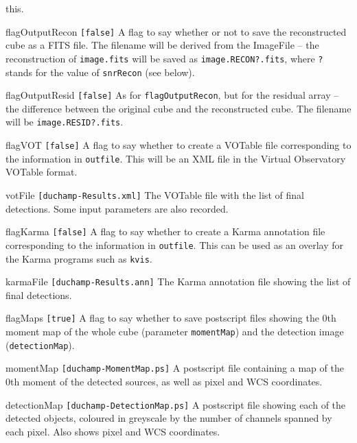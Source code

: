 \documentclass[12pt,a4paper]{article}
\newcommand{\entrylabel}[1]{\mbox{\textsf{\bf{#1:}}}\hfil}
\newenvironment{entry}
        {\begin{list}{}%
                {\renewcommand{\makelabel}{\entrylabel}%
                        \setlength{\labelwidth}{30mm}%
                        \setlength{\labelsep}{5pt}%
                        \setlength{\itemsep}{2pt}%
                        \setlength{\parsep}{2pt}%
                        \setlength{\leftmargin}{35mm}%
                }%
        }%
{\end{list}}
\begin{document}
\begin{entry}
  this.
\item[flagOutputRecon \texttt{[false]}] A flag to say whether or not to
  save the reconstructed cube as a FITS file. The filename will be
  derived from the ImageFile -- the reconstruction of \texttt{image.fits}
  will be saved as \texttt{image.RECON?.fits}, where \texttt{?} stands for
  the value of \texttt{snrRecon} (see below).
\item[flagOutputResid \texttt{[false]}] As for \texttt{flagOutputRecon}, but
  for the residual array -- the difference between the original cube
  and the reconstructed cube. The filename will be \texttt{image.RESID?.fits}.
\item[flagVOT \texttt{[false]}] A flag to say whether to create a VOTable
  file corresponding to the information in \texttt{outfile}. This will be
  an XML file in the Virtual Observatory VOTable format.
\item[votFile \texttt{[duchamp-Results.xml]}] The VOTable file with the
  list of final detections. Some input parameters are also recorded.
\item[flagKarma \texttt{[false]}] A flag to say whether to create a
  Karma annotation file corresponding to the information in
  \texttt{outfile}. This can be used as an overlay for the Karma
  programs such as \texttt{kvis}.
\item[karmaFile \texttt{[duchamp-Results.ann]}] The Karma annotation
  file showing the list of final detections. 
\item[flagMaps \texttt{[true]}] A flag to say whether to save
  postscript files showing the 0th moment map of the whole cube
  (parameter \texttt{momentMap}) and the detection image
  (\texttt{detectionMap}).
\item[momentMap \texttt{[duchamp-MomentMap.ps]}] A postscript file
  containing a map of the 0th moment of the detected sources, as well
  as pixel and WCS coordinates.
\item[detectionMap \texttt{[duchamp-DetectionMap.ps]}] A postscript
  file showing each of the detected objects, coloured in greyscale by
  the number of channels spanned by each pixel. Also shows pixel and WCS
  coordinates.
\end{entry}
\end{document}
